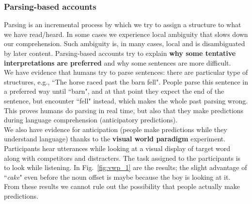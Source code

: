 \subsubsection{Parsing-based accounts}
Parsing is an incremental process by which we try to assign a structure to what we have read/heard. In some cases we experience local ambiguity that slows down our comprehension. Such ambiguity is, in many cases, local and is disambiguated by later content. Parsing-based accounts try to explain \textbf{why some tentative interpretations are preferred} and why some sentences are more difficult.\\

We have evidence that humans try to parse sentences: there are particular type of structures, e.g., ``The horse raced past the barn fell". People parse this sentence in a preferred way until ``barn", and at that point they expect the end of the sentence, but encounter ``fell" instead, which makes the whole past parsing wrong. This proves humans do parsing in real time, but also that they make predictions during language comprehension (anticipatory predictions).\\

We also have evidence for anticipation (people make predictions while they understand language) thanks to the \textbf{visual world paradigm} experiment. Participants hear utterances while looking at a visual display of target word along with competitors and distracters. The task assigned to the participants is to look while listening. In Fig.~\ref{fig:vwp_1} are the results; the slight advantage of ``\textit{cake}" even before the noun offset is maybe because the boy is looking at it. From these results we cannot rule out the possibility that people actually make predictions.

